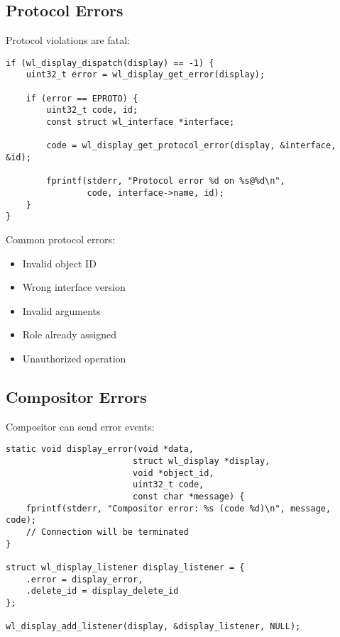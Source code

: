 \subsection{Protocol Errors}

Protocol violations are fatal:

\begin{lstlisting}[style=cstyle, caption=Detecting Protocol Errors]
if (wl_display_dispatch(display) == -1) {
    uint32_t error = wl_display_get_error(display);

    if (error == EPROTO) {
        uint32_t code, id;
        const struct wl_interface *interface;

        code = wl_display_get_protocol_error(display, &interface, &id);

        fprintf(stderr, "Protocol error %d on %s@%d\n",
                code, interface->name, id);
    }
}
\end{lstlisting}

Common protocol errors:
\begin{itemize}
    \item Invalid object ID
    \item Wrong interface version
    \item Invalid arguments
    \item Role already assigned
    \item Unauthorized operation
\end{itemize}

\subsection{Compositor Errors}

Compositor can send error events:

\begin{lstlisting}[style=cstyle, caption=Display Error Event]
static void display_error(void *data,
                         struct wl_display *display,
                         void *object_id,
                         uint32_t code,
                         const char *message) {
    fprintf(stderr, "Compositor error: %s (code %d)\n", message, code);
    // Connection will be terminated
}

struct wl_display_listener display_listener = {
    .error = display_error,
    .delete_id = display_delete_id
};

wl_display_add_listener(display, &display_listener, NULL);
\end{lstlisting}

